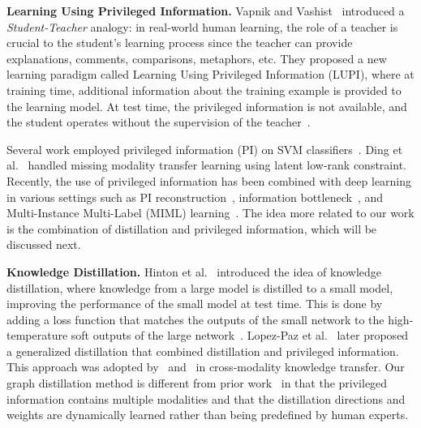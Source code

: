 \noindent\textbf{Learning Using Privileged Information.} Vapnik and Vashist~\cite{privileged_vapnik} introduced a \textit{Student-Teacher} analogy: in real-world human learning, the role of a teacher is crucial to the student's learning process since the teacher can provide explanations, comments, comparisons, metaphors, etc. They proposed a new learning paradigm called Learning Using Privileged Information (LUPI), where at training time, additional information about the training example is provided to the learning model. At test time, the privileged information is not available, and the student operates without the supervision of the teacher~\cite{privileged_vapnik}.

Several work employed privileged information (PI) on SVM classifiers~\cite{privileged_vapnik,hidden_information_wang}. Ding et al.~\cite{ding2015missing} handled missing modality transfer learning using latent low-rank constraint. Recently, the use of privileged information has been combined with deep learning in various settings such as PI reconstruction~\cite{privileged_on_depth_shi,pedestrian_xu}, information bottleneck~\cite{information_bottleneck_motiian}, and Multi-Instance Multi-Label (MIML) learning~\cite{yang2017miml}. The idea more related to our work is the combination of distillation and privileged information, which will be discussed next.

\noindent\textbf{Knowledge Distillation.}
Hinton et al.~\cite{distillation_hinton} introduced the idea of knowledge distillation, where knowledge from a large model is distilled to a small model, improving the performance of the small model at test time. This is done by adding a loss function that matches the outputs of the small network to the high-temperature soft outputs of the large network~\cite{distillation_hinton}. Lopez-Paz et al.~\cite{unifying} later proposed a generalized distillation that combined distillation and privileged information. This approach was adopted by~\cite{hallucination_hoffman} and~\cite{distillation_gupta} in cross-modality knowledge transfer. Our graph distillation method is different from prior work~\cite{distillation_hinton,li2017learning,unifying,privileged_on_depth_shi} in that the privileged information contains multiple modalities and that the distillation directions and weights are dynamically learned rather than being predefined by human experts.
